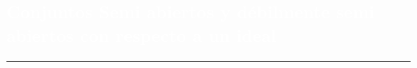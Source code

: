 \begin{titlepage}
\pagecolor{white}
\BgThispage
{}
\vspace*{-1.1cm}
\noindent
\def\titulo#1{\section{#1}}
\section{\bf\large\textcolor{white}{ Conjuntos Semi abiertos y d\'ebilmente semi abiertos con respecto a un ideal}}

\vspace*{2cm}\par
\noindent

\begin{minipage}{0.5\linewidth}
\begin{minipage}{0.45\linewidth}
    \begin{flushright}
        \printauthor
    \end{flushright}
\end{minipage} \hspace{0pt}
%
\begin{minipage}{0.02\linewidth}
      \color{ptctitle} \rule{1pt}{175pt}
\end{minipage} 
\end{minipage}
\hspace*{-4.5cm}
%
\begin{minipage}{0.85\linewidth}
\begin{minipage}{0.85\linewidth}
\footnotesize
\vspace{5pt}
    \begin{resumen}
    

\end{resumen}
\end{minipage}
\end{minipage}
\end{titlepage}
